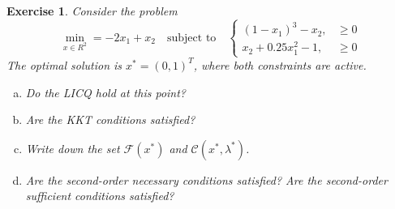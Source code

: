 \documentclass[11pt,a4paper]{article}
\renewcommand{\(}{\left(}
\renewcommand{\)}{\right)}
\newtheorem{exercise}{Exercise}
\begin{document}
  \setcounter{exercise}{18}
  \begin{exercise}
  Consider the problem
  \[ \min_{x \in R^2}=-2x_1+x_2 \quad \mbox{subject to} \quad 
  \begin{cases}
  (1-x_1)^3-x_2, & \geq 0 \\
  x_2+0.25x_1^2-1,& \geq 0
  \end{cases} \]
  The optimal solution is $x^\ast=(0,1)^T$, where both constraints are active.
  \begin{enumerate}[(a)]
  \item Do the LICQ hold at this point?
  \item Are the KKT conditions satisfied?
  \item Write down the set $\mathcal{F}(x^\ast)$ and $\mathcal{C}(x^\ast,\lambda^\ast)$.
  \item Are the second-order necessary conditions satisfied? Are the second-order sufficient conditions satisfied?
  \end{enumerate}
  \end{exercise}  
\end{document}
